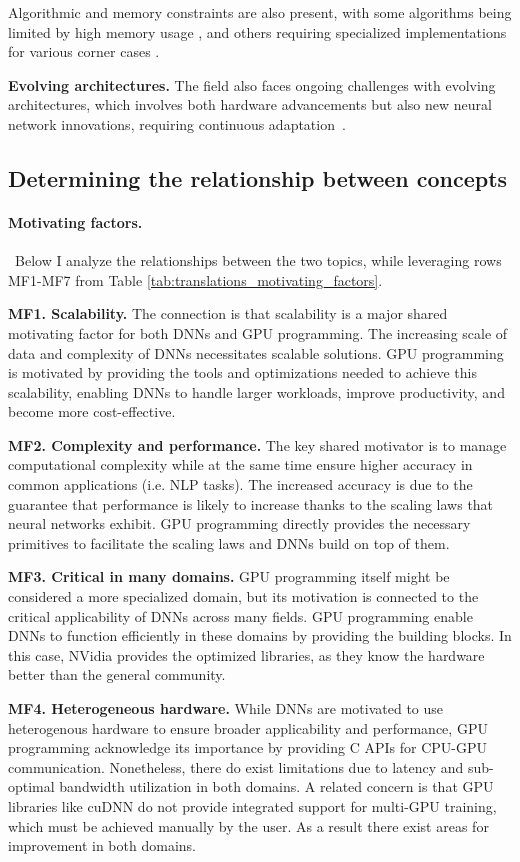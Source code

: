 Algorithmic and memory constraints are also present, with some algorithms being limited by high
memory usage , and others requiring specialized implementations for various corner
cases .

\textbf{Evolving architectures.}
The field also faces ongoing challenges with evolving architectures, which involves both hardware advancements
but also new neural network innovations, requiring continuous adaptation~.

\subsection{Determining the relationship between concepts}

\paragraph{Motivating factors.}\
Below I analyze the relationships between the two topics, while leveraging rows MF1-MF7 from Table
\ref{tab:translations_motivating_factors}.

\textbf{MF1. Scalability.}
The connection is that scalability is a major shared motivating factor for both DNNs and GPU programming.
The increasing scale of data and complexity of DNNs necessitates scalable solutions. GPU programming is
motivated by providing the tools and optimizations needed to achieve this scalability, enabling DNNs to
handle larger workloads, improve productivity, and become more cost-effective.

\textbf{MF2. Complexity and performance.}
The key shared motivator is to manage computational complexity while at the same time ensure higher accuracy
in common applications (i.e. NLP tasks). The increased accuracy is due to the guarantee that performance
is likely to increase thanks to the scaling laws that neural networks exhibit.
GPU programming directly provides the necessary primitives to facilitate the scaling laws and DNNs build on top of them.

\textbf{MF3. Critical in many domains.}
GPU programming itself might be considered a more specialized domain, but its motivation is connected to the
critical applicability of DNNs across many fields. GPU programming enable DNNs to function efficiently in
these domains by providing the building blocks. In this case, NVidia provides the optimized libraries, as
they know the hardware better than the general community.

\textbf{MF4. Heterogeneous hardware.}
While DNNs are motivated to use heterogenous hardware to ensure broader applicability and performance, GPU programming
acknowledge its importance by providing C APIs for CPU-GPU communication. Nonetheless, there do exist limitations
due to latency and sub-optimal bandwidth utilization in both domains. A related concern is that GPU libraries like cuDNN do not provide
integrated support for multi-GPU training, which must be achieved manually by the user. As a result there exist areas
for improvement in both domains.

